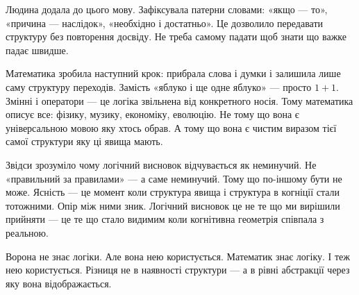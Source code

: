 \documentclass[12pt, a4paper, openany]{book}
\begin{document}
Людина додала до цього мову. Зафіксувала патерни словами: «якщо --- то», «причина --- наслідок», «необхідно і достатньо». Це дозволило передавати структуру без повторення досвіду. Не треба самому падати щоб знати що важке падає швидше.

Математика зробила наступний крок: прибрала слова і думки і залишила лише саму структуру переходів. Замість «яблуко і ще одне яблуко» --- просто $1+1$. Змінні і оператори --- це логіка звільнена від конкретного носія. Тому математика описує все: фізику, музику, економіку, еволюцію. Не тому що вона є універсальною мовою яку хтось обрав. А тому що вона є чистим виразом тієї самої структури яку ці явища мають.

Звідси зрозуміло чому логічний висновок відчувається як неминучий. Не «правильний за правилами» --- а саме неминучий. Тому що по-іншому бути не може. Ясність --- це момент коли структура явища і структура в когніції стали тотожними. Опір між ними зник. Логічний висновок це не те що ми вирішили прийняти --- це те що стало видимим коли когнітивна геометрія співпала з реальною.

Ворона не знає логіки. Але вона нею користується. Математик знає логіку. І теж нею користується. Різниця не в наявності структури --- а в рівні абстракції через яку вона відображається.
\end{document}

